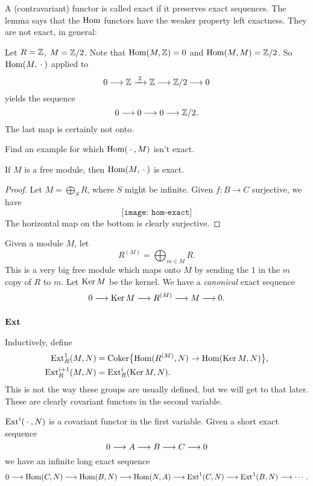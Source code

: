 A (contravariant) functor is called exact if it preserves exact
sequences. The lemma says that the \(\operatorname{Hom}\) functors have the weaker
property left exactness. They are not exact, in general:

\begin{example}
  Let \(R=\mathbb{Z}\), \(M=\mathbb{Z}/2\). Note that \(\operatorname{Hom}(M,\mathbb{Z})=0\) and
  \(\operatorname{Hom}(M,M)=\mathbb{Z}/2\). So \(\operatorname{Hom}(M,{}\cdot{})\) applied to
  \[0\longrightarrow\mathbb{Z}\xrightarrow{\,\,2\,\,}\mathbb{Z}\longrightarrow\mathbb{Z}/2\longrightarrow 0\]
  yields the sequence
  \[0\longrightarrow 0\longrightarrow 0\longrightarrow\mathbb{Z}/2.\]
  The last map is certainly not onto.
\end{example}

\begin{exercise}
  Find an example for which \(\operatorname{Hom}({}\cdot{},M)\) isn't exact.
\end{exercise}

\begin{lemma}
  If \(M\) is a free module, then \(\operatorname{Hom}(M,{}\cdot{})\) is exact.
\end{lemma}
\begin{proof}
  Let \(M=\bigoplus_S R\), where \(S\) might be infinite. Given \(f\colon
  B\to C\) surjective, we have
  \[
    \texttt{[image: hom-exact]}
  \]
  The horizontal map on the bottom is clearly surjective.
\end{proof}

Given a module \(M\), let
\[
  R^{(M)}=\bigoplus_{m\in M} R.
\]
This is a very big free module which maps onto \(M\) by sending the \(1\)
in the \(m\) copy of \(R\) to \(m\). Let \(\operatorname{Ker} M\) be the
kernel. We have a \emph{canonical} exact sequence
\begin{equation}
  \label{eq:alggeom:canonical-exact-seq}
  0\longrightarrow\operatorname{Ker} M\longrightarrow R^{(M)}\longrightarrow M\longrightarrow 0.
\end{equation}
\subsection[\(\Ext\)]{\(\boldsymbol{\operatorname{Ext}}\)}
Inductively, define
\begin{align*}
  \operatorname{Ext}^1_R(M,N)
  &=\operatorname{Coker}\bigl\{\operatorname{Hom}(R^{(M)},N)\to\operatorname{Hom}(\operatorname{Ker} M,N)\bigr\},\\
  \operatorname{Ext}_R^{i+1}(M,N)
  &=\operatorname{Ext}_R^i(\operatorname{Ker} M,N).
\end{align*}
This is not the way these groups are usually defined, but we will get to
that later. These are clearly covariant functors in the second variable.

\begin{theorem}
  \(\operatorname{Ext}^i({}\cdot{},N)\) is a covariant functor in the first variable. Given
  a short exact sequence
  \[
    0\longrightarrow A\longrightarrow B\longrightarrow C\longrightarrow 0
  \]
  we have an infinite long exact sequence
  \[
    0\longrightarrow\operatorname{Hom}(C,N)\longrightarrow\operatorname{Hom}(B,N)\longrightarrow\operatorname{Hom}(N,A)\longrightarrow\operatorname{Ext}^1(C,N)\longrightarrow\operatorname{Ext}^1(B,N)\longrightarrow\cdots.
  \]
\end{theorem}

